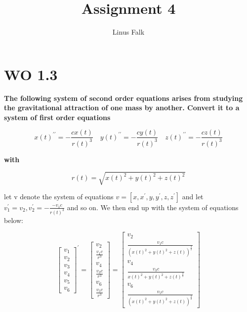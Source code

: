 \documentclass[a4paper]{article}
\title{Assignment 4}
\author{Linus Falk}
\begin{document}
\maketitle
\section*{WO 1.3}
\textbf{The following system of second order equations arises from studying the gravitational attraction of one mass by another. Convert it to a system of first order equations}

\begin{equation}
x(t)^{\prime \prime} = -\frac{cx(t)} {r(t)^{3}} \quad y(t)^{\prime \prime} = -\frac{cy(t)} {r(t)^{3}}  \quad z(t)^{\prime \prime} = -\frac{cz(t)} {r(t)^{3}}  
\end{equation}

\textbf{with} 

\begin{equation}
r(t) = \sqrt{x(t)^{2}+y(t)^{2}+z(t)^{2}}
\end{equation}

let v denote the system of equations $v =[x, x^{\prime}, y, y^{\prime},z, z^{\prime} ] $ and let $v_1^{\prime} = v_2, v_2^{\prime} = -\frac{-v_1c} {r(t)^{3}}$ and so on. We then end up with the system of equations below: 

\begin{equation}
 \begin{bmatrix} v_1 \\ v_2 \\v_3 \\v_4 \\v_5 \\v_6 \end{bmatrix}^{\prime} = \begin{bmatrix} v_2 \\ \frac{v_1c} {r^{3}} \\ v_4 \\ \frac{v_3c} {r^{3}}  \\ v_6 \\ \frac{v_5c} {r^{3}}   \end{bmatrix} = \begin{bmatrix} v_2 \\ \frac{v_1c} {(x(t)^{2}+y(t)^{2}+z(t))^{\frac{3} {2} }} \\ v_4 \\ \frac{v_3c} {x(t)^{2}+y(t)^{2}+z(t)^{\frac{3} {2} }}  \\ v_6 \\ \frac{v_5c} {(x(t)^{2}+y(t)^{2}+z(t))^{\frac{3} {2} }}   \end{bmatrix}
 \end{equation} 
\end{document}
